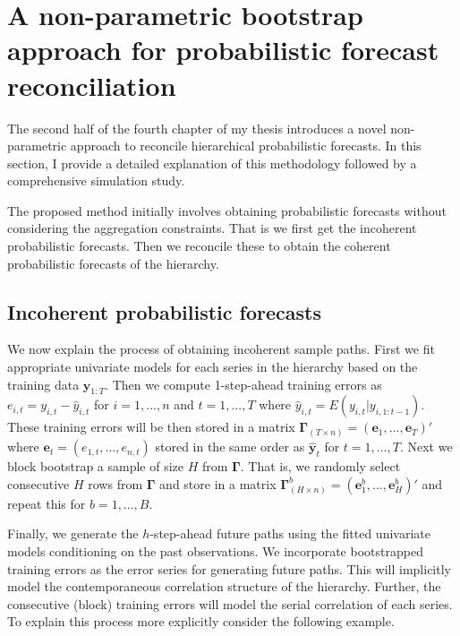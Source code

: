 \section{A non-parametric bootstrap approach for probabilistic forecast reconciliation}\label{sec:non-para}

The second half of the fourth chapter of my thesis introduces a novel non-parametric approach to reconcile hierarchical probabilistic forecasts. In this section, I provide a detailed explanation of this methodology followed by a comprehensive simulation study.


The proposed method initially involves obtaining probabilistic forecasts without considering the aggregation constraints. That is we first get the incoherent probabilistic forecasts. Then we reconcile these to obtain the coherent probabilistic forecasts of the hierarchy. 

\subsection{Incoherent probabilistic forecasts} \label{Subsec:Incoherent_samplePaths}
We now explain the process of obtaining incoherent sample paths. First we fit appropriate univariate models for each series in the hierarchy based on the training data $\bm{y}_{1:T}$. Then we compute 1-step-ahead training errors as $e_{i,t} = y_{i,t} - \hat{y}_{i,t}$ for $i=1,...,n$ and $t = 1,...,T$ where $\hat{y}_{i,t} = E(y_{i,t}|y_{i,1:t-1})$. These training errors will be then stored in a matrix $\bm{\Gamma}_{(T \times n)} = (\bm{e}_1,...,\bm{e}_T)'$ where $\bm{e}_t = (e_{1,t},...,e_{n,t})$ stored in the same order as $\bm{\hat{y}}_t$ for $t=1,...,T$. Next we block bootstrap a sample of size $H$ from $\bm{\Gamma}$. That is, we randomly select consecutive $H$ rows from $\bm{\Gamma}$ and store in a matrix $\bm{\Gamma}^b_{(H \times n)} = (\bm{e}^b_1,...,\bm{e}^b_H)'$ and repeat this for $b = 1,...,B$.  

Finally, we generate the $h$-step-ahead future paths using the fitted univariate models conditioning on the past observations. We incorporate bootstrapped training errors as the error series for generating future paths. This will implicitly model the contemporaneous correlation structure of the hierarchy. Further, the consecutive (block) training errors will model the serial correlation of each series. To explain this process more explicitly consider the following example. \\


